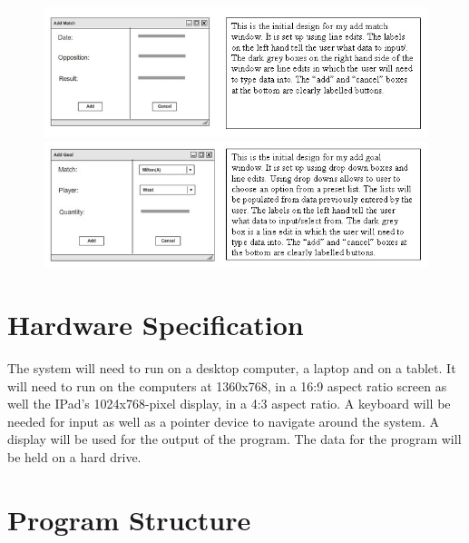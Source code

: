 \begin{figure}[H]
	\includegraphics{addMatchUifTxt}
	\includegraphics{addGoalUifTxt}
\end{figure}
\section{Hardware Specification}
The system will need to run on a desktop computer, a laptop and on a tablet. It will need to run on the computers at 1360x768, in a 16:9 aspect ratio screen as well the IPad's 1024x768-pixel display, in a 4:3 aspect ratio. A keyboard will be needed for input as well as a pointer device to navigate around the system. A display will be used for the output of the program. The data for the program will be held on a hard drive.
\section{Program Structure}


